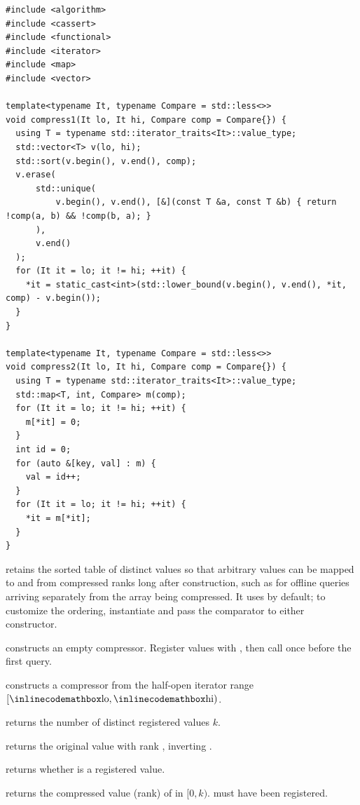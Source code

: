 \begin{lstlisting}[style=cpp]
#include <algorithm>
#include <cassert>
#include <functional>
#include <iterator>
#include <map>
#include <vector>

template<typename It, typename Compare = std::less<>>
void compress1(It lo, It hi, Compare comp = Compare{}) {
  using T = typename std::iterator_traits<It>::value_type;
  std::vector<T> v(lo, hi);
  std::sort(v.begin(), v.end(), comp);
  v.erase(
      std::unique(
          v.begin(), v.end(), [&](const T &a, const T &b) { return !comp(a, b) && !comp(b, a); }
      ),
      v.end()
  );
  for (It it = lo; it != hi; ++it) {
    *it = static_cast<int>(std::lower_bound(v.begin(), v.end(), *it, comp) - v.begin());
  }
}

template<typename It, typename Compare = std::less<>>
void compress2(It lo, It hi, Compare comp = Compare{}) {
  using T = typename std::iterator_traits<It>::value_type;
  std::map<T, int, Compare> m(comp);
  for (It it = lo; it != hi; ++it) {
    m[*it] = 0;
  }
  int id = 0;
  for (auto &[key, val] : m) {
    val = id++;
  }
  for (It it = lo; it != hi; ++it) {
    *it = m[*it];
  }
}
\end{lstlisting}
 retains the sorted table of distinct values so that arbitrary values can be mapped to and from compressed ranks long after construction, such as for offline queries arriving separately from the array being compressed. It uses  by default; to customize the ordering, instantiate  and pass the comparator to either constructor.

\begin{compactitem}
  \item {} constructs an empty compressor. Register values with , then call  once before the first query.
  \item {} constructs a compressor from the half-open iterator range $[{\inlinecodemath{lo}}, {\inlinecodemath{hi}})$.
  \item {} returns the number of distinct registered values $k$.
  \item {} returns the original value with rank , inverting .
  \item {} returns whether  is a registered value.
  \item {} returns the compressed value (rank) of  in $[0, k)$.  must have been registered.
\end{compactitem}

